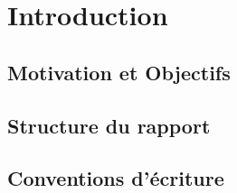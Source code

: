 \chapter[Introduction]{Introduction}
\blindtext

\section[Motivations et objectifs]{Motivation et Objectifs}
\blindtext


\section[Structure du rapport]{Structure du rapport}
\blindtext

\section[Table des symoles]{Conventions d'écriture}
\blindtext
\blindtext
